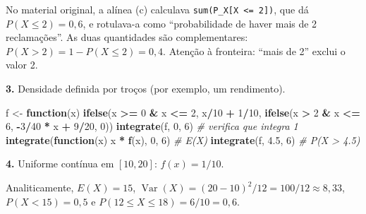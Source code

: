 \documentclass[
  portuguese,
  11pt,
  openany]{book}
\newenvironment{Shaded}{\begin{snugshade}}{\end{snugshade}}
\newcommand{\CommentTok}[1]{\textcolor[rgb]{0.56,0.35,0.01}{\textit{#1}}}
\newcommand{\ControlFlowTok}[1]{\textcolor[rgb]{0.13,0.29,0.53}{\textbf{#1}}}
\newcommand{\DecValTok}[1]{\textcolor[rgb]{0.00,0.00,0.81}{#1}}
\newcommand{\FloatTok}[1]{\textcolor[rgb]{0.00,0.00,0.81}{#1}}
\newcommand{\FunctionTok}[1]{\textcolor[rgb]{0.13,0.29,0.53}{\textbf{#1}}}
\newcommand{\NormalTok}[1]{#1}
\newcommand{\OtherTok}[1]{\textcolor[rgb]{0.56,0.35,0.01}{#1}}
\newcommand{\SpecialCharTok}[1]{\textcolor[rgb]{0.81,0.36,0.00}{\textbf{#1}}}
\begin{document}
No material original, a alínea (c) calculava \texttt{sum(P\_X{[}X\ \textless{}=\ 2{]})}, que dá
\(P(X \le 2) = 0{,}6\), e rotulava-a como ``probabilidade de haver mais de 2
reclamações''. As duas quantidades são complementares: \(P(X > 2) = 1 - P(X \le 2)
= 0{,}4\). Atenção à fronteira: ``mais de 2'' exclui o valor 2.

\textbf{3.} Densidade definida por troços (por exemplo, um rendimento).

\begin{Shaded}
\begin{Highlighting}[]
\NormalTok{f }\OtherTok{\textless{}{-}} \ControlFlowTok{function}\NormalTok{(x) }\FunctionTok{ifelse}\NormalTok{(x }\SpecialCharTok{\textgreater{}=} \DecValTok{0} \SpecialCharTok{\&}\NormalTok{ x }\SpecialCharTok{\textless{}=} \DecValTok{2}\NormalTok{, x}\SpecialCharTok{/}\DecValTok{10} \SpecialCharTok{+} \DecValTok{1}\SpecialCharTok{/}\DecValTok{10}\NormalTok{,}
                 \FunctionTok{ifelse}\NormalTok{(x }\SpecialCharTok{\textgreater{}} \DecValTok{2} \SpecialCharTok{\&}\NormalTok{ x }\SpecialCharTok{\textless{}=} \DecValTok{6}\NormalTok{, }\SpecialCharTok{{-}}\DecValTok{3}\SpecialCharTok{/}\DecValTok{40} \SpecialCharTok{*}\NormalTok{ x }\SpecialCharTok{+} \DecValTok{9}\SpecialCharTok{/}\DecValTok{20}\NormalTok{, }\DecValTok{0}\NormalTok{))}
\FunctionTok{integrate}\NormalTok{(f, }\DecValTok{0}\NormalTok{, }\DecValTok{6}\NormalTok{)                     }\CommentTok{\# verifica que integra 1}
\FunctionTok{integrate}\NormalTok{(}\ControlFlowTok{function}\NormalTok{(x) x }\SpecialCharTok{*} \FunctionTok{f}\NormalTok{(x), }\DecValTok{0}\NormalTok{, }\DecValTok{6}\NormalTok{)  }\CommentTok{\# E(X)}
\FunctionTok{integrate}\NormalTok{(f, }\FloatTok{4.5}\NormalTok{, }\DecValTok{6}\NormalTok{)                   }\CommentTok{\# P(X \textgreater{} 4.5)}
\end{Highlighting}
\end{Shaded}

\textbf{4.} Uniforme contínua em \([10, 20]\): \(f(x) = 1/10\).

Analiticamente, \(E(X) = 15\), \(\operatorname{Var}(X) = (20-10)^2/12 = 100/12
\approx 8{,}33\), \(P(X < 15) = 0{,}5\) e \(P(12 \le X \le 18) = 6/10 = 0{,}6\).
\end{document}
